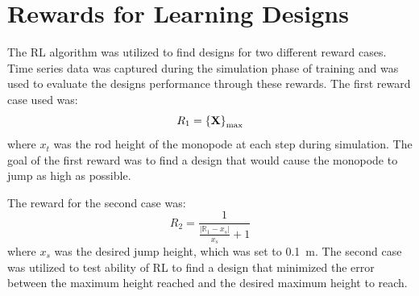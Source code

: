 \section{Rewards for Learning Designs}
The RL algorithm was utilized to find designs for two different reward cases. Time series data was captured during the simulation phase of training and was used to evaluate the designs performance through these rewards. The first reward case used was:
%
\begin{equation}
        R_1 = \left \{ \textup{\textbf{X}} \right \}_{\textup{max}}
\end{equation}
% 
where $x_t$ was the rod height of the monopode at each step during simulation. The goal of the first reward was to find a design that would cause the monopode to jump as high as possible. 

The reward for the second case was:
%
\begin{equation}
        R_2 = \frac{1}{\frac{\left | \mathbb{R}_1 - x_s \right |}{x_s} + 1}
\end{equation}
%
where $x_s$ was the desired jump height, which was set to 0.1~m. The second case was utilized to test ability of RL to find a design that minimized the error between the maximum height reached and the desired maximum height to reach.

